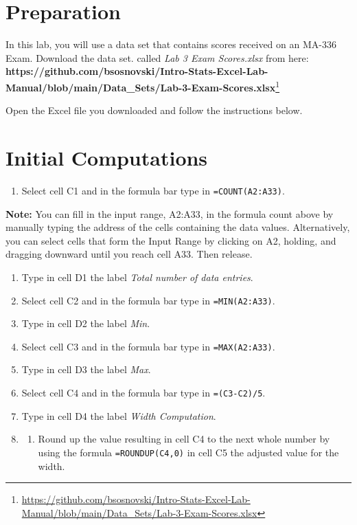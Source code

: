 \documentclass[
  12pt,
  letterpaper,
]{book}
\providecommand{\tightlist}{%
  \setlength{\itemsep}{0pt}\setlength{\parskip}{0pt}}
\DeclareRobustCommand{\href}[2]{#2\footnote{\url{#1}}}
\begin{document}
\hypertarget{preparation}{%
\section{Preparation}\label{preparation}}

In this lab, you will use a data set that contains scores received on an MA-336 Exam. Download the data set. called \emph{Lab 3 Exam Scores.xlsx} from here: \href{https://github.com/bsosnovski/Intro-Stats-Excel-Lab-Manual/blob/main/Data_Sets/Lab-3-Exam-Scores.xlsx}{\textbf{https://github.com/bsosnovski/Intro-Stats-Excel-Lab-Manual/blob/main/Data\_Sets/Lab-3-Exam-Scores.xlsx}}

Open the Excel file you downloaded and follow the instructions below.

\hypertarget{initial-computations}{%
\section{Initial Computations}\label{initial-computations}}

\begin{enumerate}
\def\labelenumi{\arabic{enumi}.}
\tightlist
\item
  Select cell C1 and in the formula bar type in \texttt{=COUNT(A2:A33)}.
\end{enumerate}

\textbf{Note:} You can fill in the input range, A2:A33, in the formula count above by manually typing the address of the cells containing the data values. Alternatively, you can select cells that form the Input Range by clicking on A2, holding, and dragging downward until you reach cell A33. Then release.

\begin{enumerate}
\def\labelenumi{\arabic{enumi}.}
\setcounter{enumi}{1}
\item
  Type in cell D1 the label \emph{Total number of data entries}.
\item
  Select cell C2 and in the formula bar type in \texttt{=MIN(A2:A33)}.
\item
  Type in cell D2 the label \emph{Min}.
\item
  Select cell C3 and in the formula bar type in \texttt{=MAX(A2:A33)}.
\item
  Type in cell D3 the label \emph{Max}.
\item
  Select cell C4 and in the formula bar type in \texttt{=(C3-C2)/5}.
\item
  Type in cell D4 the label \emph{Width Computation}.
\item
  \begin{enumerate}
  \def\labelenumii{\arabic{enumii})}
  \setcounter{enumii}{8}
  \tightlist
  \item
    Round up the value resulting in cell C4 to the next whole number by using the formula \texttt{=ROUNDUP(C4,0)} in cell C5 the adjusted value for the width.
  \end{enumerate}
\end{enumerate}
\end{document}
